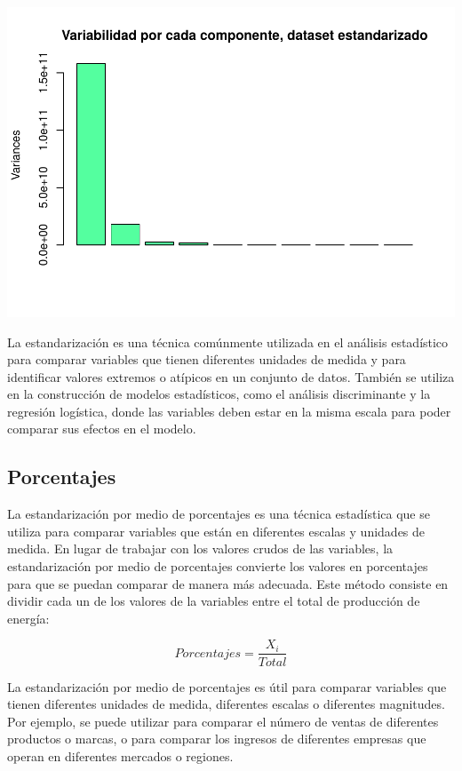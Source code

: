 \documentclass[
]{article}
\begin{document}
\includegraphics{AMTV_Docum_Consolidado_files/figure-latex/unnamed-chunk-13-1.pdf}

La estandarización es una técnica comúnmente utilizada en el análisis
estadístico para comparar variables que tienen diferentes unidades de
medida y para identificar valores extremos o atípicos en un conjunto de
datos. También se utiliza en la construcción de modelos estadísticos,
como el análisis discriminante y la regresión logística, donde las
variables deben estar en la misma escala para poder comparar sus efectos
en el modelo.

\hypertarget{porcentajes}{%
\subsection{Porcentajes}\label{porcentajes}}

La estandarización por medio de porcentajes es una técnica estadística
que se utiliza para comparar variables que están en diferentes escalas y
unidades de medida. En lugar de trabajar con los valores crudos de las
variables, la estandarización por medio de porcentajes convierte los
valores en porcentajes para que se puedan comparar de manera más
adecuada. Este método consiste en dividir cada un de los valores de la
variables entre el total de producción de energía:

\[Porcentajes=\frac{X_i}{Total}\]

La estandarización por medio de porcentajes es útil para comparar
variables que tienen diferentes unidades de medida, diferentes escalas o
diferentes magnitudes. Por ejemplo, se puede utilizar para comparar el
número de ventas de diferentes productos o marcas, o para comparar los
ingresos de diferentes empresas que operan en diferentes mercados o
regiones.
\end{document}
